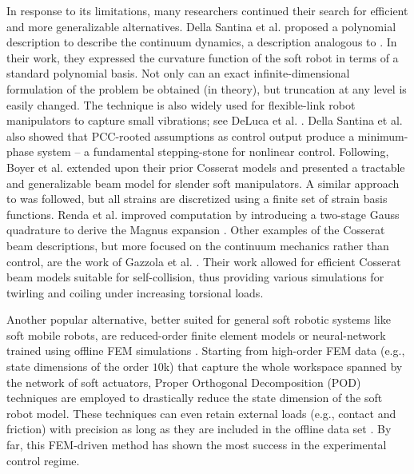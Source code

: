 In response to its limitations, many researchers continued their search for efficient and more generalizable alternatives. Della Santina et al. \cite{DellaSantina2020} proposed a polynomial description to describe the continuum dynamics, a description analogous to \cite{Chirikjian1992}. In their work, they expressed the curvature function of the soft robot in terms of a standard polynomial basis. Not only can an exact infinite-dimensional formulation of the problem be obtained (in theory), but truncation at any level is easily changed. The technique is also widely used for flexible-link robot manipulators to capture small vibrations; see DeLuca et al. \cite{DeLuca2016Jul}. Della Santina et al. also showed that PCC-rooted assumptions as control output produce a minimum-phase system \cite{DellaSantina2020} -- a fundamental stepping-stone for nonlinear control. Following, Boyer et al. \cite{Boyer2021} extended upon their prior Cosserat models \cite{Renda2018,Renda2020} and presented a tractable and generalizable beam model for slender soft manipulators. A similar approach to \cite{DellaSantina2020} was followed, but all strains are discretized using a finite set of strain basis functions. Renda et al. \cite{Renda2020} improved computation by introducing a two-stage Gauss quadrature \cite{Zanna1999} to derive the Magnus expansion \cite{Hairer2002}. Other examples of the Cosserat beam descriptions, but more focused on the continuum mechanics rather than control, are the work of Gazzola et al. \cite{Gazzola2018}. Their work allowed for efficient Cosserat beam models suitable for self-collision, thus providing various simulations for twirling and coiling under increasing torsional loads.

Another popular alternative, better suited for general soft robotic systems like soft mobile robots, are reduced-order finite element models \cite{Duriez2013,Coevoet2017,Coevoet2017Feb,Goury2018,Thieffry2017,Thieffry2020,Tonkens2021May,Katzschmann2019Apr,Wu2021Feb,Zhang2017} or neural-network trained using offline FEM simulations \cite{Fang2020Dec}. Starting from high-order FEM data (e.g., state dimensions of the order $10$k) that capture the whole workspace spanned by the network of soft actuators, Proper Orthogonal Decomposition (POD) techniques are employed to drastically reduce the state dimension of the soft robot model. These techniques can even retain external loads (e.g., contact and friction) with precision as long as they are included in the offline data set \cite{Goury2018}. By far, this FEM-driven method has shown the most success in the experimental control regime.
